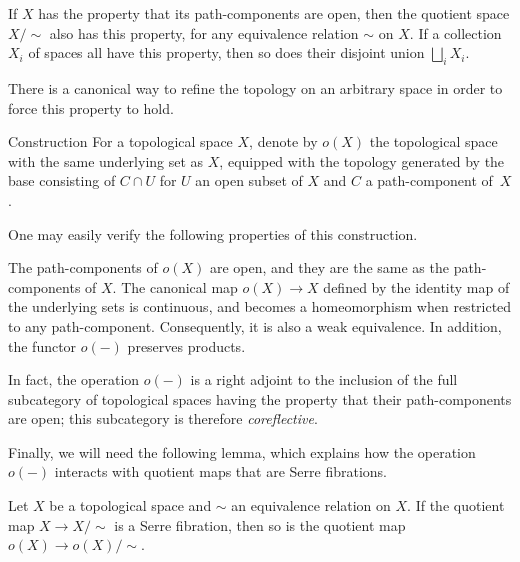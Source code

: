 \documentclass[AHL,Unicode,published]{cedram}
\begin{document}
\begin{lemm}\label{lem:open-path-components}
If $X$ has the property that its path-components are open, then the quotient space $X/{\sim}$ also has this property, for any equivalence relation $\sim$ on $X$. If a collection~$X_i$ of spaces all have this property, then so does their disjoint union $\bigsqcup_i X_i$.
\end{lemm}

There is a canonical way to refine the topology on an arbitrary space in order to force this property to hold.

\begin{enonce}{Construction}\label{construction:open-path-components}
For a topological space $X$, denote by $o(X)$ the topological space with the same underlying set as $X$, equipped with the topology generated by the base consisting of $C \cap U$ for $U$ an open subset of $X$ and $C$ a path-component of~$X$.
\end{enonce}

One may easily verify the following properties of this construction.

\begin{lemm}\label{lem:properties-of-o}
The path-components of $o(X)$ are open, and they are the same as the path-components of $X$. The canonical map $o(X) \to X$ defined by the identity map of the underlying sets is continuous, and becomes a homeomorphism when restricted to any path-component. Consequently, it is also a weak equivalence. In addition, the functor $o(-)$ preserves products.
\end{lemm}

\begin{rema}\label{rmk:coreflective-subcategory}
In fact, the operation $o(-)$ is a right adjoint to the inclusion of the full subcategory of topological spaces having the property that their path-components are open; this subcategory is therefore \emph{coreflective}.
\end{rema}

Finally, we will need the following lemma, which explains how the operation $o(-)$ interacts with quotient maps that are Serre fibrations.

\begin{lemm}\label{lem:open-path-components-Serre-fibrations}
Let $X$ be a topological space and $\sim$ an equivalence relation on $X$. If the quotient map $X \to X/{\sim}$ is a Serre fibration, then so is the quotient map $o(X) \to o(X)/{\sim}$.
\end{lemm}
\end{document}
